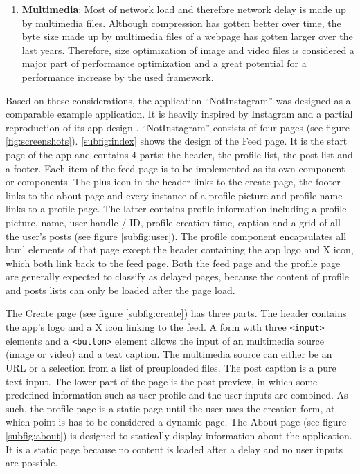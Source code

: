 \documentclass[a4paper, 10pt]{article}
\begin{document}
\begin{enumerate}
  \item \textbf{Multimedia}: Most of network load and therefore network delay is made up by multimedia files. %
  Although compression has gotten better over time, the byte size made up by multimedia files of a webpage has gotten larger over the last years. %
  Therefore, size optimization of image and video files is considered a major part of performance optimization and a great potential for a performance increase by the used framework.

\end{enumerate}

Based on these considerations, the application \enquote{NotInstagram} was designed as a comparable example application.
It is heavily inspired by Instagram and a partial reproduction of its app design \citep{instagram}.
\enquote{NotInstagram} consists of four pages (see figure \ref{fig:screenshots}).
\ref{subfig:index} shows the design of the Feed page.
It is the start page of the app and contains 4 parts: the header, the profile list, the post list and a footer.
Each item of the feed page is to be implemented as its own component or components.
The plus icon in the header links to the create page, the footer links to the about page and every instance of a profile picture and profile name links to a profile page.
The latter contains profile information including a profile picture, name, user handle / ID, profile creation time, caption and a grid of all the user's posts (see figure \ref{subfig:user}).
The profile component encapsulates all \acrshort{html} elements of that page except the header containing the app logo and X icon, which both link back to the feed page.
Both the feed page and the profile page are generally expected to classify as delayed pages, because the content of profile and posts lists can only be loaded after the page load.

The Create page (see figure \ref{subfig:create}) has three parts.
The header contains the app's logo and a X icon linking to the feed.
A form with three \verb|<input>| elements and a \verb|<button>| element allows the input of an multimedia source (image or video) and a text caption.
The multimedia source can either be an URL or a selection from a list of preuploaded files.
The post caption is a pure text input.
The lower part of the page is the post preview, in which some predefined information such as user profile and the user inputs are combined.
As such, the profile page is a static page until the user uses the creation form, at which point is has to be considered a dynamic page.
The About page (see figure \ref{subfig:about}) is designed to statically display information about the application.
It is a static page because no content is loaded after a delay and no user inputs are possible.
\end{document}
